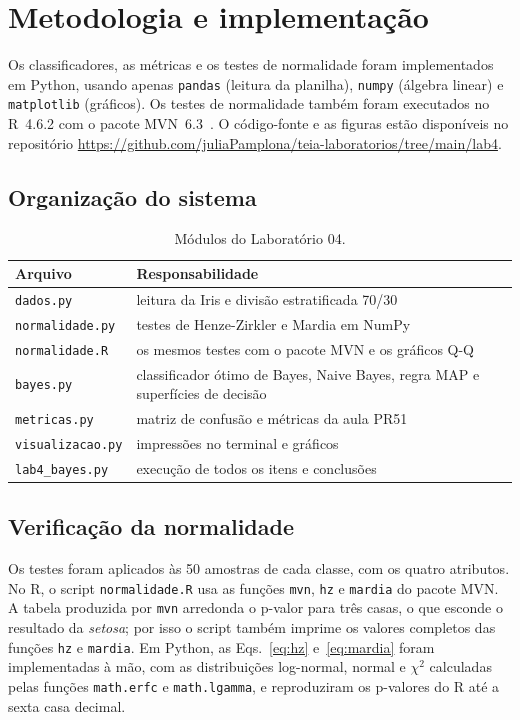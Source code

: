 \documentclass[12pt,a4paper]{article}
\newcommand{\repositorio}{\url{https://github.com/juliaPamplona/teia-laboratorios/tree/main/lab4}}
\newcommand{\setosa}{\emph{setosa}}
\begin{document}
\section{Metodologia e implementação}

Os classificadores, as métricas e os testes de normalidade foram implementados em Python, usando apenas \texttt{pandas} (leitura da planilha), \texttt{numpy} (álgebra linear) e \texttt{matplotlib} (gráficos). Os testes de normalidade também foram executados no R~4.6.2 com o pacote MVN~6.3~\cite{mvn}. O código-fonte e as figuras estão disponíveis no repositório \repositorio.

\subsection{Organização do sistema}

\begin{table}[H]
\centering
\caption{Módulos do Laboratório 04.}
\label{tab:modulos}
\begin{tabular}{lp{10.5cm}}
\toprule
Arquivo & Responsabilidade \\
\midrule
\texttt{dados.py}          & leitura da Iris e divisão estratificada 70/30 \\
\texttt{normalidade.py}    & testes de Henze-Zirkler e Mardia em NumPy \\
\texttt{normalidade.R}     & os mesmos testes com o pacote MVN e os gráficos Q-Q \\
\texttt{bayes.py}          & classificador ótimo de Bayes, Naive Bayes, regra MAP e superfícies de decisão \\
\texttt{metricas.py}       & matriz de confusão e métricas da aula PR51 \\
\texttt{visualizacao.py}   & impressões no terminal e gráficos \\
\texttt{lab4\_bayes.py}    & execução de todos os itens e conclusões \\
\bottomrule
\end{tabular}
\end{table}

\subsection{Verificação da normalidade}

Os testes foram aplicados às 50 amostras de cada classe, com os quatro atributos. No R, o script \texttt{normalidade.R} usa as funções \texttt{mvn}, \texttt{hz} e \texttt{mardia} do pacote MVN. A tabela produzida por \texttt{mvn} arredonda o p-valor para três casas, o que esconde o resultado da \setosa{}; por isso o script também imprime os valores completos das funções \texttt{hz} e \texttt{mardia}. Em Python, as Eqs.~\eqref{eq:hz} e~\eqref{eq:mardia} foram implementadas à mão, com as distribuições log-normal, normal e $\chi^2$ calculadas pelas funções \texttt{math.erfc} e \texttt{math.lgamma}, e reproduziram os p-valores do R até a sexta casa decimal.
\end{document}
